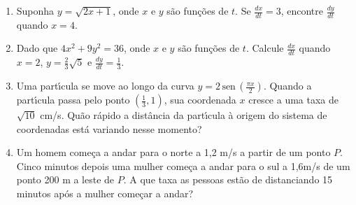 \documentclass[a4paper,5pt]{amsbook}
\newcommand{\sen}{\,\mbox{sen}\,}
\newcommand{\ds}{\displaystyle}
\begin{document}
\begin{enumerate}
    \vspace{0.5cm}
    \item Suponha $y=\sqrt{2x+1}$, onde $x$ e $y$ s\~ao fun\c{c}\~oes de $t$.  Se
        $\ds\frac{dx}{dt}=3$, encontre $\ds\frac{dy}{dt}$ quando $x=4$.

    \vspace{0.5cm}
    \item Dado que $4x^2+9y^2=36$, onde $x$ e $y$ s\~ao fun\c{c}\~oes de $t$. Calcule
        $\ds\frac{dx}{dt}$ quando $x=2$, $y=\ds\frac{2}{3}\sqrt{5}$ e
        $\ds\frac{dy}{dt}=\frac{1}{3}$.

    \vspace{0.5cm}
    \item Uma part\'{\i}cula se move ao longo da curva $y=2\ds\sen{\left(\frac{\pi
                    x}{2}\right)}$. Quando a part\'{\i}cula passa pelo ponto
        $\left(\ds\frac{1}{3},1\right)$, sua coordenada $x$ cresce a uma taxa
        de $\sqrt{10}$ cm/s. Qu\~ao r\'apido a dist\^ancia da part\'{\i}cula \`a origem do
        sistema de coordenadas est\'a variando nesse momento?

    \vspace{0.5cm}
    \item Um homem come\c{c}a a andar para o norte a 1,2 m/s a partir de um ponto
        $P$. Cinco minutos depois uma mulher come\c{c}a a andar para o sul a
        1,6m/s de um ponto 200 m a leste de $P$. A que taxa as pessoas est\~ao
        de distanciando 15 minutos ap\'os a mulher come\c{c}ar a andar?

\end{enumerate}
\end{document}
